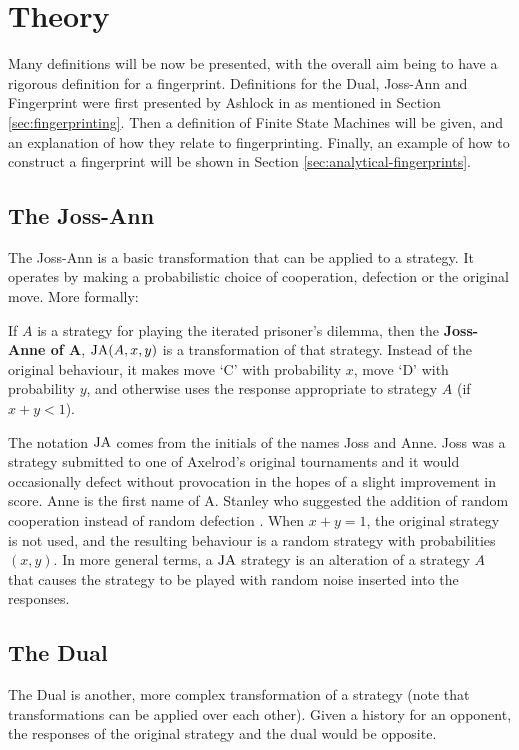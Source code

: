 
\chapter{Theory}\label{cha:theory}

Many definitions will be now be presented, with the overall aim being to have a rigorous definition for a fingerprint.
Definitions for the Dual, Joss-Ann and Fingerprint were first presented by Ashlock in \cite{Ashlock2004} as mentioned in Section \ref{sec:fingerprinting}.
Then a definition of Finite State Machines will be given, and an explanation of how they relate to fingerprinting.
Finally, an example of how to construct a fingerprint will be shown in Section \ref{sec:analytical-fingerprints}.

\section{The Joss-Ann}\label{sec:joss-ann}
The Joss-Ann is a basic transformation that can be applied to a strategy.
It operates by making a probabilistic choice of cooperation, defection or the original move.
More formally:

\begin{definition}\label{def:joss-ann}
If $A$ is a strategy for playing the iterated prisoner's dilemma, then the \textbf{Joss-Anne of A}, $\text{JA}(A, x, y)$ is a transformation of that strategy.
Instead of the original behaviour, it makes move `C' with probability $x$, move `D' with probability $y$, and otherwise uses the response appropriate to strategy $A$ (if $x+y < 1$).
\end{definition}

The notation $\text{JA}$ comes from the initials of the names Joss and Anne.
Joss was a strategy submitted to one of Axelrod’s original tournaments and it would occasionally defect without provocation in the hopes of a slight improvement in score.
Anne is the first name of A. Stanley who suggested the addition of random cooperation instead of random defection \cite{Ashlock2008}.
When $x + y = 1$, the original strategy is not used, and the resulting behaviour is a random strategy with probabilities $(x, y)$.
In more general terms, a $\text{JA}$ strategy is an alteration of a strategy $A$ that causes the strategy to be played with random noise inserted into the responses.

\section{The Dual}\label{sec:dual}
The Dual is another, more complex transformation of a strategy (note that transformations can be applied over each other).
Given a history for an opponent, the responses of the original strategy and the dual would be opposite.

